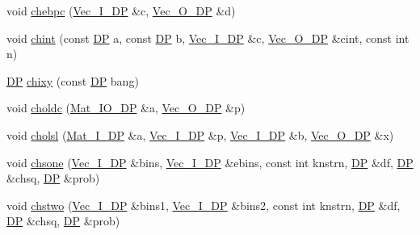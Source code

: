 \begin{DoxyCompactItemize}
\item 
void \mbox{\hyperlink{namespaceNR_a76a061d807150f37b176e040ce5c93c4}{chebpc}} (\mbox{\hyperlink{namespaceNR_a9f943da53862537c552e2a770cb170ae}{Vec\+\_\+\+I\+\_\+\+DP}} \&c, \mbox{\hyperlink{namespaceNR_a970094d23441f8ef6a45282a7eb2103d}{Vec\+\_\+\+O\+\_\+\+DP}} \&d)
\item 
void \mbox{\hyperlink{namespaceNR_a5d3b77d2ac43628be77688f9cf398473}{chint}} (const \mbox{\hyperlink{namespaceNR_af6ff762dd605ff477b8e52387253a02a}{DP}} a, const \mbox{\hyperlink{namespaceNR_af6ff762dd605ff477b8e52387253a02a}{DP}} b, \mbox{\hyperlink{namespaceNR_a9f943da53862537c552e2a770cb170ae}{Vec\+\_\+\+I\+\_\+\+DP}} \&c, \mbox{\hyperlink{namespaceNR_a970094d23441f8ef6a45282a7eb2103d}{Vec\+\_\+\+O\+\_\+\+DP}} \&cint, const int n)
\item 
\mbox{\hyperlink{namespaceNR_af6ff762dd605ff477b8e52387253a02a}{DP}} \mbox{\hyperlink{namespaceNR_a78d98f7ea50330e48e2439f1476f1a11}{chixy}} (const \mbox{\hyperlink{namespaceNR_af6ff762dd605ff477b8e52387253a02a}{DP}} bang)
\item 
void \mbox{\hyperlink{namespaceNR_ade5b24841dfda9180b307c75b572c2e5}{choldc}} (\mbox{\hyperlink{namespaceNR_ad1513aa4697878ed3bff0b8b3c9dd910}{Mat\+\_\+\+I\+O\+\_\+\+DP}} \&a, \mbox{\hyperlink{namespaceNR_a970094d23441f8ef6a45282a7eb2103d}{Vec\+\_\+\+O\+\_\+\+DP}} \&p)
\item 
void \mbox{\hyperlink{namespaceNR_aac72daccbf4c98d768d3aaae022c3f88}{cholsl}} (\mbox{\hyperlink{namespaceNR_a2b8abfda8fffad6ba0a1b5a4c0773dbf}{Mat\+\_\+\+I\+\_\+\+DP}} \&a, \mbox{\hyperlink{namespaceNR_a9f943da53862537c552e2a770cb170ae}{Vec\+\_\+\+I\+\_\+\+DP}} \&p, \mbox{\hyperlink{namespaceNR_a9f943da53862537c552e2a770cb170ae}{Vec\+\_\+\+I\+\_\+\+DP}} \&b, \mbox{\hyperlink{namespaceNR_a970094d23441f8ef6a45282a7eb2103d}{Vec\+\_\+\+O\+\_\+\+DP}} \&x)
\item 
void \mbox{\hyperlink{namespaceNR_a79990074123af59275160b7887c3fc51}{chsone}} (\mbox{\hyperlink{namespaceNR_a9f943da53862537c552e2a770cb170ae}{Vec\+\_\+\+I\+\_\+\+DP}} \&bins, \mbox{\hyperlink{namespaceNR_a9f943da53862537c552e2a770cb170ae}{Vec\+\_\+\+I\+\_\+\+DP}} \&ebins, const int knstrn, \mbox{\hyperlink{namespaceNR_af6ff762dd605ff477b8e52387253a02a}{DP}} \&df, \mbox{\hyperlink{namespaceNR_af6ff762dd605ff477b8e52387253a02a}{DP}} \&chsq, \mbox{\hyperlink{namespaceNR_af6ff762dd605ff477b8e52387253a02a}{DP}} \&prob)
\item 
void \mbox{\hyperlink{namespaceNR_ae212f167f2b1e98deda943eb3aacd84b}{chstwo}} (\mbox{\hyperlink{namespaceNR_a9f943da53862537c552e2a770cb170ae}{Vec\+\_\+\+I\+\_\+\+DP}} \&bins1, \mbox{\hyperlink{namespaceNR_a9f943da53862537c552e2a770cb170ae}{Vec\+\_\+\+I\+\_\+\+DP}} \&bins2, const int knstrn, \mbox{\hyperlink{namespaceNR_af6ff762dd605ff477b8e52387253a02a}{DP}} \&df, \mbox{\hyperlink{namespaceNR_af6ff762dd605ff477b8e52387253a02a}{DP}} \&chsq, \mbox{\hyperlink{namespaceNR_af6ff762dd605ff477b8e52387253a02a}{DP}} \&prob)

\end{DoxyCompactItemize}
